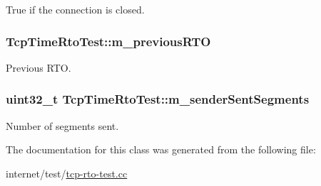 True if the connection is closed. 

\subsubsection[{\texorpdfstring{m\+\_\+previous\+R\+TO}{m_previousRTO}}]{ Tcp\+Time\+Rto\+Test\+::m\+\_\+previous\+R\+TO\hspace{0.3cm}{\ttfamily [private]}}\hypertarget{classTcpTimeRtoTest_a783e8a412243d5c091ace7b2e252789b}{}\label{classTcpTimeRtoTest_a783e8a412243d5c091ace7b2e252789b}


Previous R\+TO. 

\subsubsection[{\texorpdfstring{m\+\_\+sender\+Sent\+Segments}{m_senderSentSegments}}]{\setlength{\rightskip}{0pt plus 5cm}uint32\+\_\+t Tcp\+Time\+Rto\+Test\+::m\+\_\+sender\+Sent\+Segments\hspace{0.3cm}{\ttfamily [private]}}\hypertarget{classTcpTimeRtoTest_a186a4f5d05d6419be25d9de538848fab}{}\label{classTcpTimeRtoTest_a186a4f5d05d6419be25d9de538848fab}


Number of segments sent. 



The documentation for this class was generated from the following file\+:\begin{DoxyCompactItemize}
\item 
internet/test/\hyperlink{tcp-rto-test_8cc}{tcp-\/rto-\/test.\+cc}\end{DoxyCompactItemize}
